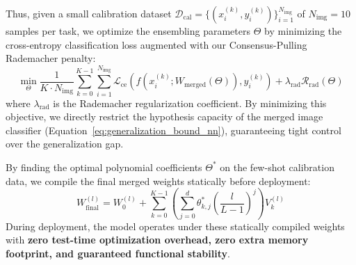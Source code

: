 Thus, given a small calibration dataset $\mathcal{D}_{\text{cal}} = \{(x_i^{(k)}, y_i^{(k)})\}_{i=1}^{N_{\text{img}}}$ of $N_{\text{img}} = 10$ samples per task, we optimize the ensembling parameters $\Theta$ by minimizing the cross-entropy classification loss augmented with our Consensus-Pulling Rademacher penalty:
\begin{equation}
\min_{\Theta} \frac{1}{K \cdot N_{\text{img}}} \sum_{k=0}^{K-1} \sum_{i=1}^{N_{\text{img}}} \mathcal{L}_{\text{ce}}\left(f\left(x_i^{(k)}; W_{\text{merged}}(\Theta)\right), y_i^{(k)}\right) + \lambda_{\text{rad}} \mathcal{R}_{\text{rad}}(\Theta)
\end{equation}
where $\lambda_{\text{rad}}$ is the Rademacher regularization coefficient. By minimizing this objective, we directly restrict the hypothesis capacity of the merged image classifier (Equation~\ref{eq:generalization_bound_nn}), guaranteeing tight control over the generalization gap.

By finding the optimal polynomial coefficients $\Theta^*$ on the few-shot calibration data, we compile the final merged weights statically before deployment:
\begin{equation}
W_{\text{final}}^{(l)} = W_0^{(l)} + \sum_{k=0}^{K-1} \left( \sum_{j=0}^d \theta_{k,j}^* \left(\frac{l}{L-1}\right)^j \right) V_k^{(l)}
\end{equation}
During deployment, the model operates under these statically compiled weights with \textbf{zero test-time optimization overhead, zero extra memory footprint, and guaranteed functional stability}.